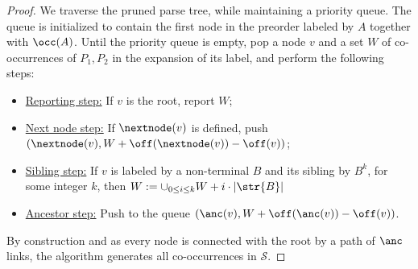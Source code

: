 \begin{proof}
    We traverse the pruned parse tree, while maintaining a priority queue. The queue is initialized to contain the first node in the preorder labeled by $A$ together with $\occ(A)$. Until the priority queue is empty, pop a node $v$ and a set $W$ of co-occurrences of $P_1,P_2$ in the expansion of its label, and perform the following steps:
    \begin{itemize}
    \item\label{step:reporting} \underline{Reporting step:}  If $v$ is the root, report $W$;
    \item \label{step:next} \underline{Next node step:} If $\nextnode(v)$ is defined, push $(\nextnode(v),W+\off(\nextnode(v))-\off(v))$;
    \item \label{step:siblings} \underline {Sibling step:}  If $v$ is labeled by a non-terminal $B$ and its sibling by $B^k$, for some integer $k$, then $W := \cup_{0 \le i \le k} W+i \cdot |\str{B}|$
    \item \label{step:anc} \underline{Ancestor step:} Push to the queue $(\anc(v),W+\off(\anc(v))-\off(v))$. 
    \end{itemize}
    
    By construction and as every node is connected with the root by a path of $\anc$ links, the algorithm generates all co-occurrences in $\mathcal{S}$. 
    

\end{proof}
